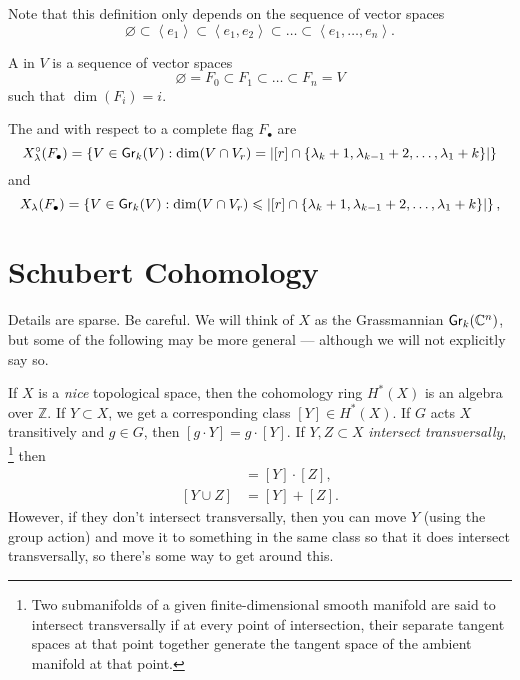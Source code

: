 Note that this definition only depends on the sequence of vector spaces
\begin{equation}
    \varnothing \subset \left\langle e_1 \right\rangle \subset \left\langle e_1, e_2 \right\rangle \subset \ldots \subset \left\langle e_1, \ldots, e_n \right\rangle.
\end{equation}

\begin{definition}
    A  in \(V\) is a sequence of vector spaces
    \begin{equation}
        \varnothing = F_0 \subset F_1 \subset \ldots \subset F_n = V
    \end{equation}
    such that \(\dim(F_i) = i\).
    \end{definition}

The  and  with respect to a complete flag \(F_{\bullet}\) are 
\begin{equation}
    X^{\circ}_{\lambda}(F_{\bullet}) =
    \left\{ V \in \operatorname{\mathsf{Gr}}_k(V) : \dim(V \cap V_r) = \left|[r] \cap \{ \lambda_k + 1, \lambda_{k-1} + 2, \ldots, \lambda_1 + k \} \right| \right\}
\end{equation}
and
\begin{equation}
    X_{\lambda}(F_{\bullet}) =
    \left\{ V \in \operatorname{\mathsf{Gr}}_k(V) : \dim(V \cap V_r) \leqslant \left|[r] \cap \{ \lambda_k + 1, \lambda_{k-1} + 2, \ldots, \lambda_1 + k \} \right| \right\},
\end{equation}

\section{Schubert Cohomology}

Details are sparse.
Be careful.
We will think of \(X\) as the Grassmannian \(\operatorname{\mathsf{Gr}}_k(\mathbb{C}^n)\),
but some of the following may be more general --- although we will not explicitly say so.

If \(X\) is a \emph{nice} topological space,
then the cohomology ring \(H^*(X)\) is an algebra over \(\mathbb{Z}\).
If \(Y \subset X\),
we get a corresponding class \([Y] \in H^*(X)\).
If \(G\) acts \(X\) transitively and \(g \in G\),
then \([g \cdot Y] = g \cdot [Y]\).
If \(Y, Z \subset X\) \emph{intersect transversally},%
\footnote{Two submanifolds of a given finite-dimensional smooth manifold are said to intersect transversally if at every point of intersection, their separate tangent spaces at that point together generate the tangent space of the ambient manifold at that point.}
then
\begin{align}
    [Y \cap Z] &= [Y] \cdot [Z], \\
    [Y \cup Z] &= [Y] + [Z].
\end{align}
However, if they don't intersect transversally, then you can move \(Y\) (using the group action) and move it to something in the same class so that it does intersect transversally, so there's some way to get around this.

